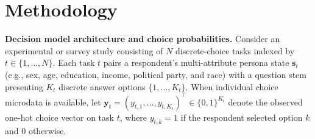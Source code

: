 \documentclass[
  11pt,
  letterpaper,
]{article}
\begin{document}
\section{Methodology}\label{sec-methodology}

\textbf{Decision model architecture and choice probabilities.} Consider
an experimental or survey study consisting of \(N\) discrete-choice
tasks indexed by \(t \in \{1, \dots, N\}\). Each task \(t\) pairs a
respondent's multi-attribute persona state \(\mathbf{s}_t\) (e.g., sex,
age, education, income, political party, and race) with a question stem
presenting \(K_t\) discrete answer options \(\{1, \dots, K_t\}\). When
individual choice microdata is available, let
\(\mathbf{y}_t = (y_{t,1}, \dots, y_{t,K_t})^\top \in \{0, 1\}^{K_t}\)
denote the observed one-hot choice vector on task \(t\), where
\(y_{t,k} = 1\) if the respondent selected option \(k\) and \(0\)
otherwise.
\end{document}
